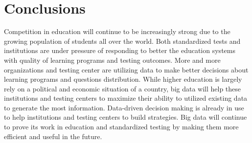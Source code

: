 \documentclass[sigconf]{acmart}
\begin{document}
\section{Conclusions}
Competition in education will continue to be increasingly strong due to the growing population of students all over the world.\cite{Selingo2017} Both standardized tests and institutions are under pressure of responding to better the education systems with quality of learning programs and testing outcomes. More and more organizations and testing center are utilizing data to make better decisions about learning programs and questions distribution. While higher education is largely rely on a political and economic situation of a country, big data will help these institutions and testing centers to maximize their ability to utilized existing data to generate the most information. Data-driven decision making is already in use to help institutions and testing centers to build strategies. Big data will continue to prove its work in education and standardized testing by making them more efficient and useful in the future. 





 
\end{document}
